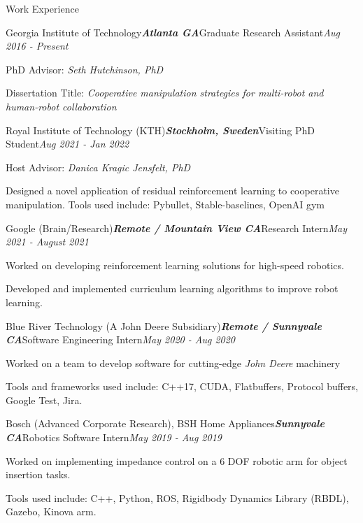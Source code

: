 \documentclass{resume} %
\begin{document}
\begin{rSection}{Work Experience}
\begin{rSubsection}{Georgia Institute of Technology}{\bf \em Atlanta GA}{Graduate Research Assistant}{\em Aug 2016 - Present}
\item PhD Advisor: {\em Seth Hutchinson, PhD}
\item Dissertation Title: {\em Cooperative manipulation strategies for multi-robot and human-robot collaboration}
\end{rSubsection}

\begin{rSubsection}{Royal Institute of Technology (KTH)}{\bf \em Stockholm, Sweden}{Visiting PhD Student}{\em Aug 2021 - Jan 2022}
\item Host Advisor: {\em Danica Kragic Jensfelt, PhD}
\item Designed a novel application of residual reinforcement learning to cooperative manipulation. Tools used include: Pybullet, Stable-baselines, OpenAI gym
\end{rSubsection}

\begin{rSubsection}{Google (Brain/Research)}{\bf \em Remote / Mountain View CA}{Research Intern}{\em May 2021 - August 2021}
\item Worked on developing reinforcement learning solutions for high-speed robotics.
\item Developed and implemented curriculum learning algorithms to improve robot learning.
\end{rSubsection}

\begin{rSubsection}{Blue River Technology (A John Deere Subsidiary)}{\bf \em Remote / Sunnyvale CA}{Software Engineering Intern}{\em May 2020 - Aug 2020}
\item Worked on a team to develop software for cutting-edge {\em John Deere} machinery
\item Tools and frameworks used include: C++17, CUDA, Flatbuffers, Protocol buffers, Google Test, Jira.
\end{rSubsection}

\begin{rSubsection}{Bosch (Advanced Corporate Research), BSH Home Appliances}{\bf \em Sunnyvale CA}{Robotics Software Intern}{\em May 2019 - Aug 2019}
\item Worked on implementing impedance control on a 6 DOF robotic arm for object insertion tasks.
\item Tools used include: C++, Python, ROS, Rigidbody Dynamics Library (RBDL), Gazebo, Kinova arm.
\end{rSubsection}


\end{rSection}
\end{document}
